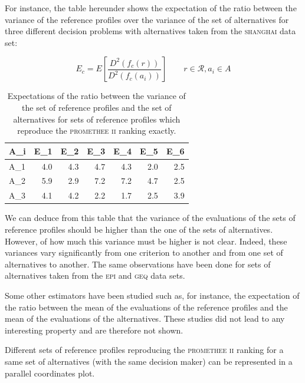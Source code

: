 For instance, the table hereunder shows the expectation of the ratio between the variance of the reference profiles over the variance of the set of alternatives for three different decision problems with alternatives taken from the \textsc{shanghai} data set:

\begin{equation}
    E_c = E[\frac{D^2(f_c(r))}{D^2(f_c(a_i))}]  \qquad r \in \mathcal{R}, a_i \in A
    \label{eq:expectation_ratio_var}
\end{equation}


\begin{table}[h]
    \centering
    \begin{tabular}{L @{\hskip 0.75cm} R R R R R R}
        \toprule
        A_i   & E_1 & E_2  & E_3& E_4& E_5& E_6 \\
        \midrule
        A_1 & 4.0   & 4.3   & 4.7   & 4.3   & 2.0   & 2.5   \\
        A_2 & 5.9   & 2.9   & 7.2   & 7.2   & 4.7   & 2.5   \\
        A_3 & 4.1   & 4.2   & 2.2   & 1.7   & 2.5   & 3.9   \\
        \bottomrule
    \end{tabular}
    \caption{Expectations of the ratio between the variance of the set of reference profiles and the set of alternatives for sets of reference profiles which reproduce the \textsc{promethee ii} ranking exactly.}
    \label{tbl:E_sigma}
\end{table}

We can deduce from this table that the variance of the evaluations of the sets of reference profiles should be higher than the one of the sets of alternatives.
However, of how much this variance must be higher is not clear.
Indeed, these variances vary significantly from one criterion to another and from one set of alternatives to another.
The same observations have been done for sets of alternatives taken from the \textsc{epi} and \textsc{geq} data sets.

Some other estimators have been studied such as, for instance, the expectation of the ratio between the mean of the evaluations of the reference profiles and the mean of the evaluations of the alternatives.
These studies did not lead to any interesting property and are therefore not shown.

Different sets of reference profiles reproducing the \textsc{promethee ii} ranking for a same set of alternatives (with the same decision maker) can be represented in a parallel coordinates plot.

